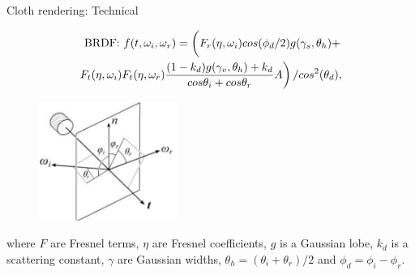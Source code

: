 \documentclass{beamer}
\begin{document}
\begin{frame}{Cloth rendering: Technical}

\begin{equation*} 
\begin{split}
\mbox{BRDF: } f(t, \omega_i, \omega_r) = \left( \vphantom{\int} F_r(\eta, \omega_i) cos(\phi_d/2)g(\gamma_s, \theta_h) + \right. \\ 
 \left. F_t(\eta, \omega_i) F_t(\eta, \omega_r) \frac{(1-k_d)g(\gamma_v, \theta_h)+k_d}{cos \theta_i + cos \theta_r} A \right) / cos^2(\theta_d),
\end{split}
\end{equation*}

\begin{multicols}{2}
\begin{figure}[b!]
\includegraphics[width=0.4\textwidth]{img/cloth_directions}
\end{figure}

\vfill
\columnbreak
\vspace*{\fill}
\small{where $F$ are Fresnel terms, $\eta$ are Fresnel coefficients, $g$ is a Gaussian lobe, $k_d$ is a scattering constant, $\gamma$ are Gaussian widths, $\theta_h = (\theta_i+\theta_r)/2$ and $\phi_d = \phi_i-\phi_r$. }
\end{multicols}

\end{frame}
\end{document}

